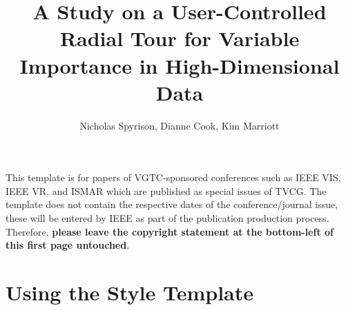 \documentclass[review,journal]{vgtc}         %
\title{A Study on a User-Controlled Radial Tour for Variable Importance in High-Dimensional Data}
\author{Nicholas Spyrison, Dianne Cook, Kim Marriott}
\begin{document}

\maketitle


This template is for papers of VGTC-sponsored conferences such as IEEE VIS, IEEE VR, and ISMAR which are published as special issues of TVCG. The template does not contain the respective dates of the conference/journal issue, these will be entered by IEEE as part of the publication production process. Therefore, \textbf{please leave the copyright statement at the bottom-left of this first page untouched}.

\section{Using the Style Template}
\end{document}
